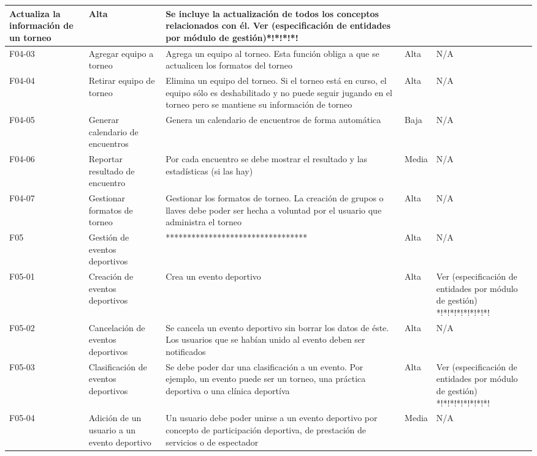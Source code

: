 \begin{table}[!htb]
\begin{center}
\begin{supertabular}{|p{1cm}|p{4cm}|p{4cm}|p{2cm}|p{4cm}|}
			Actualiza la información de un torneo & 
			Alta & 
			Se incluye la actualización de todos los conceptos relacionados con él. Ver (especificación de entidades por módulo de gestión)*!*!*!*! \\
			\hline
			F04-03 & 
			Agregar equipo a torneo & 
			Agrega un equipo al torneo. Esta función obliga a que se actualicen los formatos del torneo & 
			Alta & 
			N/A \\
			\hline
			F04-04 & 
			Retirar equipo de torneo & 
			Elimina un equipo del torneo. Si el torneo está en curso, el equipo sólo es deshabilitado y no puede seguir jugando en el torneo pero se mantiene su información de torneo & 
			Alta & 
			N/A \\
			\hline
			F04-05 & 
			Generar calendario de encuentros & 
			Genera un calendario de encuentros de forma automática & 
			Baja & 
			N/A \\
			\hline
			F04-06 & 
			Reportar resultado de encuentro & 
			Por cada encuentro se debe mostrar el resultado y las estadísticas (si las hay) & 
			Media & 
			N/A \\
			\hline
			F04-07 & 
			Gestionar formatos de torneo & 
			Gestionar los formatos de torneo. La creación de grupos o llaves debe poder ser hecha a voluntad por el usuario que administra el torneo & 
			Alta & 
			N/A \\
			\hline
			F05 & 
			Gestión de eventos deportivos & 
			********************************* & 
			Alta & 
			N/A \\
			\hline
			F05-01 & 
			Creación de eventos deportivos & 
			Crea un evento deportivo & 
			Alta & 
			Ver (especificación de entidades por módulo de gestión) *!*!*!*!*!*!*!*!\\
			\hline
			F05-02 & 
			Cancelación de eventos deportivos & 
			Se cancela un evento deportivo sin borrar los datos de éste. Los usuarios que se habían
unido al evento deben ser notificados & 
			Alta & 
			N/A \\
			\hline
			F05-03 & 
			Clasificación de eventos deportivos & 
			Se debe poder dar una clasificación a un evento. Por ejemplo, un evento puede ser un torneo, una práctica deportiva o una clínica deportíva & 
			Alta & 
			Ver (especificación de entidades por módulo de gestión) *!*!*!*!*!*!*!*!\\
			\hline
			F05-04 & 
			Adición de un usuario a un evento deportivo & 
			Un usuario debe poder unirse a un evento deportivo por concepto de participación deportiva, de prestación de servicios o de espectador & 
			Media & 
			N/A \\

\end{supertabular}
\end{center}
\end{table}
